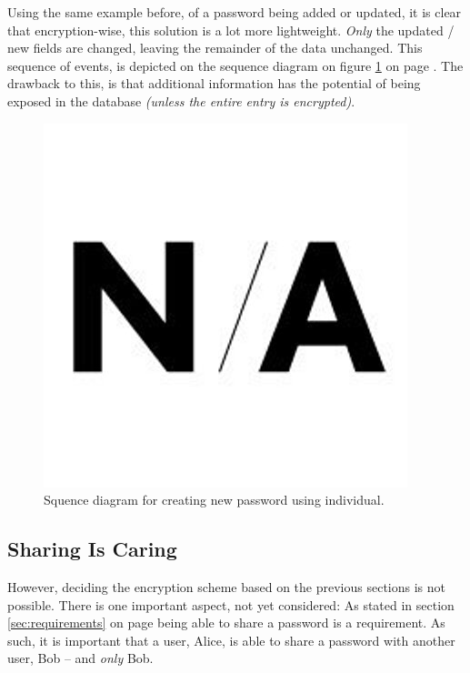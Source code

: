 			Using the same example before, of a password being added or updated, it is clear that encryption-wise, this solution is a lot more lightweight. \emph{Only} the updated / new fields are changed, leaving the remainder of the data unchanged. This sequence of events, is depicted on the sequence diagram on figure \ref{fig:seq_perentry} on page \pageref{fig:seq_perentry}. The drawback to this, is that additional information has the potential of being exposed in the database \emph{(unless the entire entry is encrypted)}.


			\begin{figure}[h!]
				\centering
				\includegraphics[width=\textwidth]{figures/design/na.png}
				\caption{Squence diagram for creating new password using individual.}
				\label{fig:seq_perentry}
			\end{figure}

		\subsection{Sharing Is Caring}
			\label{sec:share}
			However, deciding the encryption scheme based on the previous sections is not possible. There is one important aspect, not yet considered: As stated in section \ref{sec:requirements} on page \pageref{sec:requirements} being able to share a password is a requirement. As such, it is important that a user, Alice, is able to share a password with another user, Bob -- and \emph{only} Bob.

